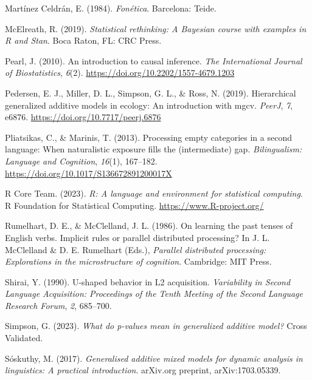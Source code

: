 \documentclass[
  letterpaper,
  DIV=11,
  numbers=noendperiod]{scrartcl}
\newlength{\cslhangindent}
\newenvironment{CSLReferences}[2] %
 {\begin{list}{}{%
  \setlength{\itemindent}{0pt}
  \setlength{\leftmargin}{0pt}
  \setlength{\parsep}{0pt}
  \ifodd #1
   \setlength{\leftmargin}{\cslhangindent}
   \setlength{\itemindent}{-1\cslhangindent}
  \fi
  \setlength{\itemsep}{#2\baselineskip}}}
 {\end{list}}
\begin{document}
\begin{CSLReferences}{1}{0}
Martínez Celdrán, E. (1984). \emph{Fon{é}tica}. Barcelona: Teide.

McElreath, R. (2019). \emph{Statistical rethinking: A {B}ayesian course
with examples in {R} and {S}tan}. Boca Raton, FL: CRC Press.

Pearl, J. (2010). An introduction to causal inference. \emph{The
International Journal of Biostatistics}, \emph{6}(2).
\url{https://doi.org/10.2202/1557-4679.1203}

Pedersen, E. J., Miller, D. L., Simpson, G. L., \& Ross, N. (2019).
Hierarchical generalized additive models in ecology: An introduction
with mgcv. \emph{PeerJ}, \emph{7}, e6876.
\url{https://doi.org/10.7717/peerj.6876}

Pliatsikas, C., \& Marinis, T. (2013). Processing empty categories in a
second language: When naturalistic exposure fills the (intermediate)
gap. \emph{Bilingualism: Language and Cognition}, \emph{16}(1),
167--182. \url{https://doi.org/10.1017/S136672891200017X}

R Core Team. (2023). \emph{R: A language and environment for statistical
computing}. R Foundation for Statistical Computing.
\url{https://www.R-project.org/}

Rumelhart, D. E., \& McClelland, J. L. (1986). On learning the past
tenses of {E}nglish verbs. Implicit rules or parallel distributed
processing? In J. L. McClelland \& D. E. Rumelhart (Eds.),
\emph{Parallel distributed processing: Explorations in the
microstructure of cognition}. Cambridge: MIT Press.

Shirai, Y. (1990). {U}-shaped behavior in {L2} acquisition.
\emph{Variability in Second Language Acquisition: Proceedings of the
Tenth Meeting of the {Second Language Research Forum}}, \emph{2},
685--700.

Simpson, G. (2023). \emph{What do p-values mean in generalized additive
model?} Cross Validated.

Sóskuthy, M. (2017). \emph{Generalised additive mixed models for dynamic
analysis in linguistics: A practical introduction}. {a}rXiv.org
preprint, arXiv:1703.05339.


\end{CSLReferences}
\end{document}
